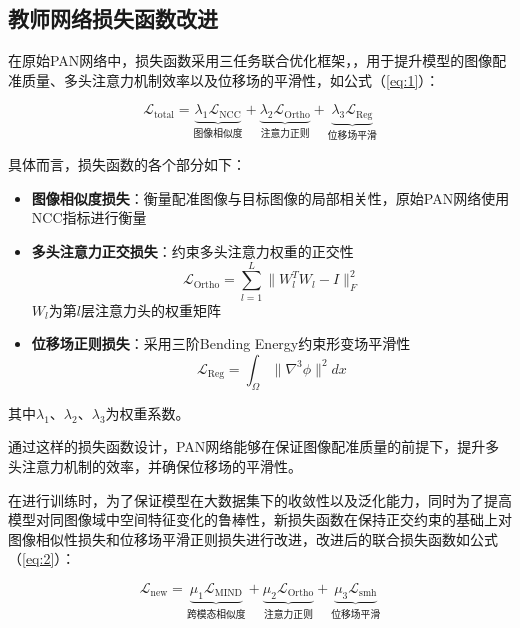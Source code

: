 \subsection{教师网络损失函数改进}

在原始PAN网络中，损失函数采用三任务联合优化框架，，用于提升模型的图像配准质量、多头注意力机制效率以及位移场的平滑性，如公式（\ref{eq:1}）：

\begin{equation}
    \mathcal{L}_{\text{total}} = \underbrace{\lambda_1 \mathcal{L}_{\text{NCC}}}_{\text{图像相似度}} + \underbrace{\lambda_2 \mathcal{L}_{\text{Ortho}}}_{\text{注意力正则}} + \underbrace{\lambda_3 \mathcal{L}_{\text{Reg}}}_{\text{位移场平滑}}
    \label{eq:1}
\end{equation}

具体而言，损失函数的各个部分如下：

\begin{itemize}
    \item \textbf{图像相似度损失}：衡量配准图像与目标图像的局部相关性，原始PAN网络使用NCC指标进行衡量

    \item \textbf{多头注意力正交损失}：约束多头注意力权重的正交性
          \begin{equation}
              \mathcal{L}_{\text{Ortho}} = \sum_{l=1}^L \|W_l^T W_l - I\|_F^2
          \end{equation}
          $W_l$为第$l$层注意力头的权重矩阵

    \item \textbf{位移场正则损失}：采用三阶Bending Energy约束形变场平滑性
          \begin{equation}
              \mathcal{L}_{\text{Reg}} = \int_\Omega \|\nabla^3 \phi\|^2 dx
          \end{equation}
\end{itemize}

其中$\lambda_1$、$\lambda_2$、$\lambda_3$为权重系数。

通过这样的损失函数设计，PAN网络能够在保证图像配准质量的前提下，提升多头注意力机制的效率，并确保位移场的平滑性。


在进行训练时，为了保证模型在大数据集下的收敛性以及泛化能力，同时为了提高模型对同图像域中空间特征变化的鲁棒性，新损失函数在保持正交约束的基础上对图像相似性损失和位移场平滑正则损失进行改进，改进后的联合损失函数如公式（\ref{eq:2}）：

\begin{equation}
    \mathcal{L}_{\text{new}} = \underbrace{\mu_1 \mathcal{L}_{\text{MIND}}}_{\text{跨模态相似度}} + \underbrace{\mu_2 \mathcal{L}_{\text{Ortho}}}_{\text{注意力正则}} + \underbrace{\mu_3 \mathcal{L}_{\text{smh}}}_{\text{位移场平滑}}
    \label{eq:2}
\end{equation}

